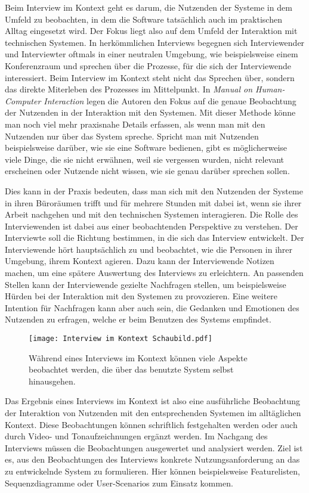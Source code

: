 Beim Interview im Kontext geht es darum, die Nutzenden der Systeme in dem
Umfeld zu beobachten, in dem die Software tatsächlich auch im praktischen
Alltag eingesetzt wird. Der Fokus liegt also auf dem Umfeld der Interaktion mit
technischen Systemen. In herkömmlichen Interviews begegnen sich Interviewender und
Interviewter oftmals in einer neutralen Umgebung, wie beispielsweise einem
Konferenzraum und sprechen über die Prozesse, für die sich der Interviewende
interessiert. Beim Interview im Kontext steht nicht das Sprechen über, sondern das direkte Miterleben des Prozesses im Mittelpunkt\cite{contextualDesign}. In \textit{Manual on Human-Computer Interaction} legen die Autoren den Fokus auf die genaue Beobachtung der
Nutzenden in der Interaktion mit den Systemen. Mit dieser Methode könne man
noch viel mehr praxisnahe Details erfassen, als wenn man mit den Nutzenden nur
über das System spreche. Spricht man mit Nutzenden beispielsweise darüber, wie
sie eine Software bedienen, gibt es möglicherweise viele Dinge, die sie nicht
erwähnen, weil sie vergessen wurden, nicht relevant erscheinen oder Nutzende
nicht wissen, wie sie genau darüber sprechen sollen\cite{hciHandbook}.

Dies kann in der Praxis bedeuten, dass man sich mit den Nutzenden der Systeme
in ihren Büroräumen trifft und für mehrere Stunden mit dabei ist, wenn sie
ihrer Arbeit nachgehen und mit den technischen Systemen interagieren. Die Rolle
des Interviewenden ist dabei aus einer beobachtenden Perspektive zu verstehen.
Der Interviewte soll die Richtung bestimmen, in die sich das Interview
entwickelt. Der Interviewende hört hauptsächlich zu und beobachtet, wie die
Personen in ihrer Umgebung, ihrem Kontext agieren\cite{hciHandbook}. Dazu kann
der Interviewende Notizen machen, um eine spätere Auswertung des Interviews zu
erleichtern. An passenden Stellen kann der Interviewende gezielte Nachfragen
stellen, um beispielsweise Hürden bei der Interaktion mit den Systemen zu
provozieren. Eine weitere Intention für Nachfragen kann aber auch sein, die
Gedanken und Emotionen des Nutzenden zu erfragen, welche er beim Benutzen des
Systems empfindet.

\begin{figure}[h]
    \caption{Während eines Interviews im Kontext können viele Aspekte beobachtet werden, die über das benutzte System selbst hinausgehen\cite{johannesGrafik}.}
    \centering
    \texttt{[image: Interview im Kontext Schaubild.pdf]}
\end{figure}

Das Ergebnis eines Interviews im Kontext ist also eine ausführliche Beobachtung
der Interaktion von Nutzenden mit den entsprechenden Systemen im alltäglichen
Kontext. Diese Beobachtungen können schriftlich festgehalten werden oder auch
durch Video- und Tonaufzeichnungen ergänzt werden. Im Nachgang des Interviews
müssen die Beobachtungen ausgewertet und analysiert werden. Ziel ist es, aus den Beobachtungen des Interviews konkrete Nutzungsanforderung an das zu
entwickelnde System zu formulieren\cite{HMI-HCD}. Hier können beispielsweise Featurelisten,
Sequenzdiagramme oder User-Scenarios zum Einsatz kommen\cite{sequenceDiagrams}.
